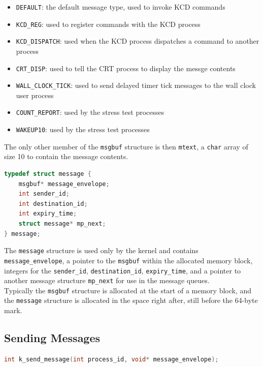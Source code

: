 \documentclass[12pt]{report}
\begin{document}
\begin{itemize}
\item {\tt DEFAULT}: the default message type, used to invoke KCD commands
\item {\tt KCD\_REG}: used to register commands with the KCD process
\item {\tt KCD\_DISPATCH}: used when the KCD process dispatches a command to another process
\item {\tt CRT\_DISP}: used to tell the CRT process to display the messge contents
\item {\tt WALL\_CLOCK\_TICK}: used to send delayed timer tick messages to the wall clock user process
\item {\tt COUNT\_REPORT}: used by the stress test processes
\item {\tt WAKEUP10}: used by the stress test processes
\end{itemize}

The only other member of the \texttt{msgbuf}
structure is then \texttt{mtext}, a \texttt{char} array of size 10 to contain the 
message contents. \\
\begin{lstlisting}[language=C, frame=single]
typedef struct message {
	msgbuf* message_envelope;
	int sender_id;
	int destination_id;
	int expiry_time;
	struct message* mp_next;
} message;
\end{lstlisting}
The \texttt{message} structure is used only by the kernel and contains \texttt{message_envelope},
a pointer to the \texttt{msgbuf} within the allocated memory block, integers for the
\texttt{sender_id}, \texttt{destination_id}, \texttt{expiry_time}, and a pointer 
to another message structure \texttt{mp_next} for use in the message queues. \\
Typically the \texttt{msgbuf} structure is allocated at the start of a memory block,
and the \texttt{message} structure is allocated in the space right after, still before
the 64-byte mark.\\


\subsection{Sending Messages}

\begin{minipage}{\textwidth}
\begin{lstlisting}[language=C, frame=single]
int k_send_message(int process_id, void* message_envelope);
\end{lstlisting}
\end{minipage}
\end{document}

